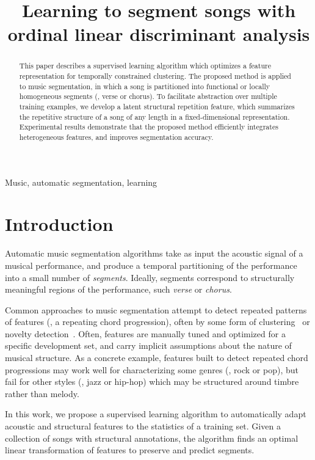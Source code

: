 \documentclass{article}
\title{Learning to segment songs with ordinal linear discriminant analysis}
\begin{document}
%
\maketitle
%
\begin{abstract}
This paper describes a supervised learning algorithm which optimizes a feature representation for temporally constrained clustering. 
The proposed method is applied to music segmentation, in which a song is partitioned into functional or
locally homogeneous segments (\eg, verse or chorus).  
To facilitate abstraction over multiple training examples, we develop a latent structural repetition feature, which summarizes the
repetitive structure of a song of any length in a fixed-dimensional representation.
Experimental results demonstrate that the proposed method efficiently integrates heterogeneous features, and improves segmentation accuracy.
\end{abstract}
%
\begin{keywords}
Music, automatic segmentation, learning
\end{keywords}
%
\section{Introduction}
\label{sec:intro}

Automatic music segmentation algorithms take as input the acoustic signal of a musical performance, and produce a temporal
partitioning of the performance into a small number of \emph{segments}.  Ideally, segments correspond to structurally
meaningful regions of the performance, such \emph{verse} or \emph{chorus}.

Common approaches to music segmentation attempt to detect repeated patterns of features (\eg, a repeating chord progression),
often by some form of clustering~\cite{levy2008structural} or novelty detection~\cite{serra2012unsupervised}.  Often, features
are manually tuned and optimized for a specific development set, and carry implicit assumptions about the nature of musical 
structure.  As a concrete example, features built to detect repeated chord progressions may work well for characterizing some 
genres (\eg, rock or pop), but fail for other styles (\eg, jazz or hip-hop) which may be structured around timbre rather than melody.

In this work, we propose a supervised learning algorithm to automatically adapt acoustic and structural features to the statistics
of a training set. Given a collection of songs with structural annotations, the algorithm finds an optimal linear transformation
of features to preserve and predict segments.
\end{document}
